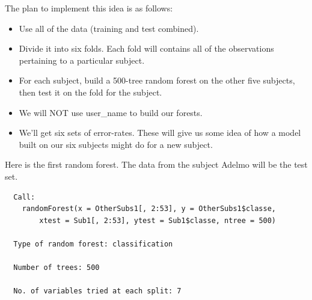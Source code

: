 \documentclass[12pt,twoside]{reedthesis}
\providecommand{\tightlist}{%
  \setlength{\itemsep}{0pt}\setlength{\parskip}{0pt}}
\begin{document}
  The plan to implement this idea is as follows:
  
  \begin{itemize}
  \tightlist
  \item
    Use all of the data (training and test combined).
  \item
    Divide it into six folds. Each fold will contains all of the
    observations pertaining to a particular subject.
  \item
    For each subject, build a 500-tree random forest on the other five
    subjects, then test it on the fold for the subject.
  \item
    We will NOT use user\_name to build our forests.
  \item
    We'll get six sets of error-rates. These will give us some idea of how
    a model built on our six subjects might do for a new subject.
  \end{itemize}
  
  Here is the first random forest. The data from the subject Adelmo will
  be the test set.
  
  \begin{Shaded}
  \begin{Highlighting}[]
  \NormalTok{(}\NormalTok{)}
  \StringTok{ }
  
  \StringTok{ }\NormalTok{wl2[wl2$user_name ==}\StringTok{ }\NormalTok{subjects[}\NormalTok{], ]}
  \StringTok{ }\NormalTok{wl2[wl2$user_name !=}\StringTok{ }\NormalTok{subjects[}\NormalTok{], ]}
  \StringTok{ }\NormalTok{(} \NormalTok{OtherSubs1[, }\NormalTok{:}\NormalTok{], } 
                                  \NormalTok{Sub1[, }\NormalTok{:}\NormalTok{], }
                                  
                                  \NormalTok{)}
  \end{Highlighting}
  \end{Shaded}
  
  \newpage
  
  \begin{verbatim}
  Call:
    randomForest(x = OtherSubs1[, 2:53], y = OtherSubs1$classe, 
        xtest = Sub1[, 2:53], ytest = Sub1$classe, ntree = 500) 
                 
  Type of random forest: classification
  
  Number of trees: 500
  
  No. of variables tried at each split: 7
  \end{verbatim}
  
\end{document}
